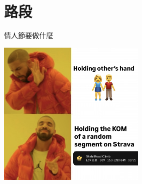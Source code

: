 \section{路段}

\begin{frame}{情人節要做什麼}
\begin{center}
\includegraphics[height=7cm]{holdmeme.JPG}
\end{center}
\end{frame}

